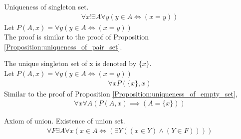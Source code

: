 \begin{prop}
\label{Proposition:uniqueness_of_singleton_set}
Uniqueness of singleton set.
\begin{align*}
\forall x !\exists A \forall y (y \in A \iff (x=y))
\end{align*}
Let $P(A,x) =  \forall y (y \in A \iff (x=y))$ \\
The proof is similar to the proof of Proposition \ref{Proposition:uniqueness_of_pair_set}.
\end{prop}

\begin{defn}
\label{Definition:singleton_set}
The unique singleton set of x is denoted by $\{ x\}$. \\
Let $P(A,x) =  \forall y (y \in A \iff (x=y))$ \\
\begin{align*}
\forall x P(\{ x \} ,x)
\end{align*}
Similar to the proof of Proposition \ref{Proposition:uniqueness_of_empty_set},
\begin{align*}
\forall x \forall A (P(A,x) \implies (A=\{ x \}))
\end{align*}
\end{defn}

\begin{axm}
\label{Axiom:axiom_of_union}
Axiom of union. Existence of union set.
\begin{align*}
\forall F \exists A \forall x (x \in A \iff (\exists Y ((x \in Y) \land (Y \in F))))
\end{align*}
\end{axm}

